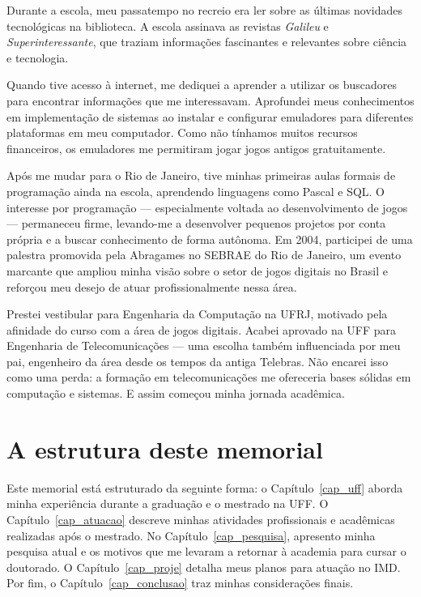 \documentclass[10pt,a4paper,oneside]{book}
\begin{document}
Durante a escola, meu passatempo no recreio era ler sobre as últimas novidades tecnológicas na biblioteca.
A escola assinava as revistas \textit{Galileu} e \textit{Superinteressante}, que traziam informações fascinantes e
relevantes sobre ciência e tecnologia.

Quando tive acesso à internet, me dediquei a aprender a utilizar os buscadores para encontrar informações que me interessavam.
Aprofundei meus conhecimentos em implementação de sistemas ao instalar e configurar emuladores para diferentes plataformas em meu computador.
Como não tínhamos muitos recursos financeiros, os emuladores me permitiram jogar jogos antigos gratuitamente.

Após me mudar para o Rio de Janeiro, tive minhas primeiras aulas formais de programação ainda na escola, aprendendo linguagens como Pascal e SQL.
O interesse por programação — especialmente voltada ao desenvolvimento de jogos — permaneceu firme, levando-me a desenvolver pequenos projetos por
conta própria e a buscar conhecimento de forma autônoma. Em 2004, participei de uma palestra promovida pela Abragames no SEBRAE do Rio de Janeiro,
um evento marcante que ampliou minha visão sobre o setor de jogos digitais no Brasil e reforçou meu desejo de atuar profissionalmente nessa área.

Prestei vestibular para Engenharia da Computação na UFRJ, motivado pela afinidade do curso com a área de jogos digitais.
Acabei aprovado na UFF para Engenharia de Telecomunicações — uma escolha também influenciada por meu pai, engenheiro da
área desde os tempos da antiga Telebras. Não encarei isso como uma perda: a formação em telecomunicações me ofereceria
bases sólidas em computação e sistemas. E assim começou minha jornada acadêmica.

\section{A estrutura deste memorial}

Este memorial está estruturado da seguinte forma: o Capítulo~\ref{cap_uff} aborda minha experiência durante a graduação
e o mestrado na UFF. O Capítulo~\ref{cap_atuacao} descreve minhas atividades profissionais e acadêmicas realizadas após
o mestrado. No Capítulo~\ref{cap_pesquisa}, apresento minha pesquisa atual e os motivos que me levaram a retornar à
academia para cursar o doutorado. O Capítulo~\ref{cap_proje} detalha meus planos para atuação no IMD.
Por fim, o Capítulo~\ref{cap_conclusao} traz minhas considerações finais.
\end{document}

